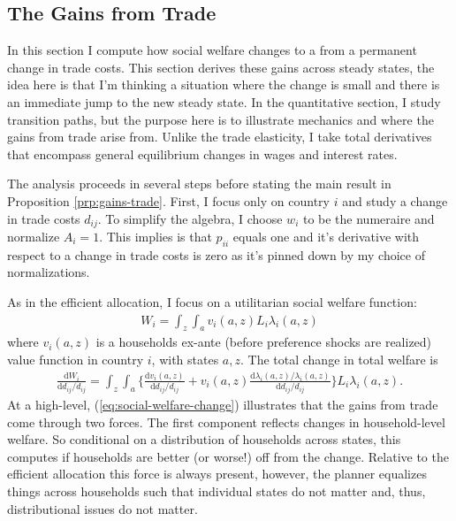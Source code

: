 \documentclass[12pt,pdftex]{article}
\begin{document}
\begin{onehalfspacing}
\subsection{The Gains from Trade}

In this section I compute how social welfare changes to a from a permanent change in trade costs. This section derives these gains across steady states, the idea here is that I'm thinking a situation where the change is small and there is an immediate jump to the new steady state. In the quantitative section, I study transition paths, but the purpose here is to illustrate mechanics and where the gains from trade arise from. Unlike the trade elasticity, I take total derivatives that encompass general equilibrium changes in wages and interest rates.

The analysis proceeds in several steps before stating the main result in Proposition \ref{prp:gains-trade}. First, I focus only on country $i$ and study a change in trade costs $d_{ij}$. To simplify the algebra, I choose $w_i$ to be the numeraire and normalize $A_i = 1$. This implies is that $p_{ii}$ equals one and it's derivative with respect to a change in trade costs is zero as it's pinned down by my choice of normalizations.

As in the efficient allocation, I focus on a utilitarian social welfare function:
\begin{align}
W_{i} = \int_{z} \int_{a}  v_{i}(a,z) L_i \lambda_{i}(a,z)
\label{eq:apx-social-welfare}
\end{align}
where $v_{i}(a,z)$ is a households ex-ante (before preference shocks are realized) value function in country $i$, with states $a,z$. The total change in total welfare is
\begin{align}
\frac{\mathrm{d} W_{i}}{\mathrm{d} d_{ij} / d_{ij}} = \int_{z} \int_{a} \bigg \{ \frac{\mathrm{d} v_i(a, z)}{\mathrm{d} d_{ij} / d_{ij}}  + v_{i}(a,z) \frac{\mathrm{d} \lambda_{i}(a,z)/ \lambda_{i}(a,z)}{\mathrm{d} d_{ij} / d_{ij}}  \bigg \} L_i \lambda_{i}(a,z).
\label{eq:social-welfare-change}
\end{align}
At a high-level, (\ref{eq:social-welfare-change}) illustrates that the gains from trade come through two forces. The first component reflects changes in household-level welfare. So conditional on a distribution of households across states, this computes if households are better (or worse!) off from the change. Relative to the efficient allocation this force is always present, however, the planner equalizes things across households such that individual states do not matter and, thus, distributional issues do not matter.


\end{onehalfspacing}
\end{document}
